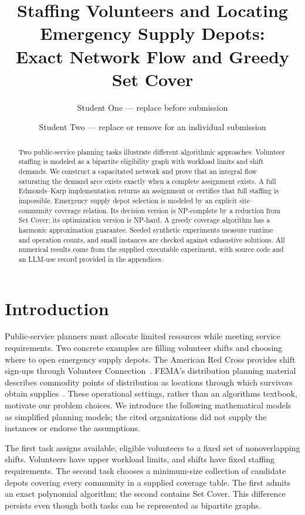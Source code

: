 \documentclass[sigconf,nonacm]{acmart}
\title{Staffing Volunteers and Locating Emergency Supply Depots:\\
Exact Network Flow and Greedy Set Cover}
\author{Student One --- replace before submission}
\affiliation{\institution{Course institution --- replace before submission}\country{}}
\author{Student Two --- replace or remove for an individual submission}
\affiliation{\institution{Course institution --- replace before submission}\country{}}
\begin{document}
\begin{abstract}
Two public-service planning tasks illustrate different algorithmic approaches.
Volunteer staffing is modeled as a bipartite eligibility graph with workload
limits and shift demands. We construct a capacitated network and prove that
an integral flow saturating the demand arcs exists exactly when a complete
assignment exists. A full Edmonds--Karp implementation returns an assignment
or certifies that full staffing is impossible. Emergency supply depot selection
is modeled by an explicit site--community coverage relation. Its decision
version is NP-complete by a reduction from Set Cover; its optimization version
is NP-hard. A greedy coverage algorithm has a harmonic approximation guarantee.
Seeded synthetic experiments measure runtime and operation counts, and small
instances are checked against exhaustive solutions. All numerical results
come from the supplied executable experiment, with source code and an LLM-use
record provided in the appendices.
\end{abstract}
\maketitle

\section{Introduction}
Public-service planners must allocate limited resources while meeting service
requirements. Two concrete examples are filling volunteer shifts and choosing
where to open emergency supply depots. The American Red Cross provides shift
sign-ups through Volunteer Connection~\cite{redcross}. FEMA's distribution
planning material describes commodity points of distribution as locations
through which survivors obtain supplies~\cite{fema}. These operational settings,
rather than an algorithms textbook, motivate our problem choices. We introduce
the following mathematical models as simplified planning models; the cited
organizations did not supply the instances or endorse the assumptions.

The first task assigns available, eligible volunteers to a fixed set of
nonoverlapping shifts. Volunteers have upper workload limits, and shifts have
fixed staffing requirements. The second task chooses a minimum-size collection
of candidate depots covering every community in a supplied coverage table.
The first admits an exact polynomial algorithm; the second contains Set Cover.
This difference persists even though both tasks can be represented as
bipartite graphs.
\end{document}
